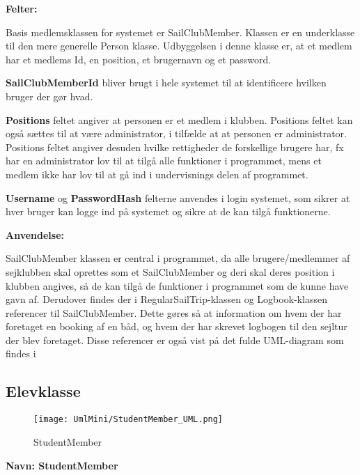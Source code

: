 \textbf{Felter:}

Basis medlemsklassen for systemet er SailClubMember. 
Klassen er en underklasse til den mere generelle Person klasse. 
Udbyggelsen i denne klasse er, at et medlem har et medlems Id, en position, et brugernavn og et password.

\textbf{SailClubMemberId} bliver brugt i hele systemet til at identificere hvilken bruger der gør hvad. 

\textbf{Positions} feltet angiver at personen er et medlem i klubben. 
Positions feltet kan også sættes til at være administrator, i tilfælde at at personen er administrator. 
Positions feltet angiver desuden hvilke rettigheder de forskellige brugere har, fx har en administrator lov til at tilgå alle funktioner i programmet, mens et medlem ikke har lov til at gå ind i undervisnings delen af programmet. 

\textbf{Username} og \textbf{PasswordHash} felterne anvendes i login systemet, som sikrer at hver bruger kan logge ind på systemet og sikre at de kan tilgå funktionerne.

\textbf{Anvendelse:}

SailClubMember klassen er central i programmet, da alle brugere/medlemmer af sejklubben skal oprettes som et SailClubMember og deri skal deres position i klubben angives, så de kan tilgå de funktioner i programmet som de kunne have gavn af. Derudover findes der i RegularSailTrip-klassen og Logbook-klassen referencer til SailClubMember. Dette gøres så at information om hvem der har foretaget en booking af en båd, og hvem der har skrevet logbogen til den sejltur der blev foretaget. Disse referencer er også vist på det fulde UML-diagram som findes i 

\subsection*{Elevklasse}

\begin{wrapfigure}[10]{R}{0.5\textwidth}
    \label{img:StudentMember}
    \vspace{-30pt}
    \begin{center}
        \texttt{[image: UmlMini/StudentMember\_UML.png]}
    \end{center}
    \vspace{-20pt}
    \caption{StudentMember}
\end{wrapfigure}

\textbf{Navn: StudentMember}

